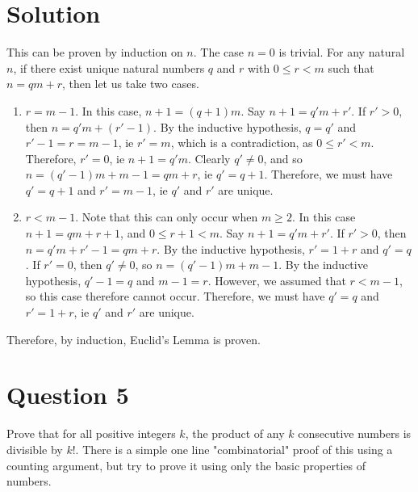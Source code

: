 \documentclass[12pt]{report}
\begin{document}
\section*{Solution}
This can be proven by induction on $n$. The case $n = 0$ is trivial. For any natural $n$, if there exist unique natural numbers $q$ and $r$ with $0 \leq r < m$ such that $n = qm + r$, then let us take two cases. 
\begin{enumerate}
  \item $r = m - 1$. In this case, $n + 1 = (q + 1)m$. Say $n + 1 = q'm + r'$. If $r' > 0$, then $n = q'm + (r' - 1)$. By the inductive hypothesis, $q = q'$ and $r' - 1 = r = m - 1$, ie $r' = m$, which is a contradiction, as $0 \leq r' < m$. Therefore, $r' = 0$, ie $n + 1 = q'm$. Clearly $q' \neq 0$, and so $n = (q' - 1)m + m - 1 = qm + r$, ie $q' = q + 1$. Therefore, we must have $q' = q + 1$ and $r' = m - 1$, ie $q'$ and $r'$ are unique.
  \item $r < m - 1$. Note that this can only occur when $m \geq 2$. In this case $n + 1 = qm + r + 1$, and $0 \leq r + 1 < m$. Say $n + 1 = q'm + r'$. If $r' > 0$, then $n = q'm + r' - 1 = qm + r$. By the inductive hypothesis, $r' = 1 + r$ and $q' = q$. If $r' = 0$, then $q' \neq 0$, so $n = (q' - 1)m + m - 1$. By the inductive hypothesis, $q' - 1 = q$ and $m - 1 = r$. However, we assumed that $r < m - 1$, so this case therefore cannot occur. Therefore, we must have $q' = q$ and $r' = 1 + r$, ie $q'$ and $r'$ are unique.
\end{enumerate}
Therefore, by induction, Euclid's Lemma is proven.
\section*{Question 5}
Prove that for all positive integers $k$, the product of any $k$ consecutive numbers is divisible by $k!$. There is a simple one line "combinatorial" proof of this using a counting argument, but try to prove it using only the basic properties of numbers.
\end{document}
